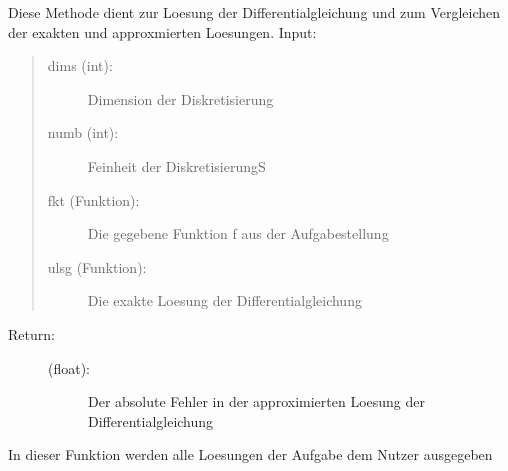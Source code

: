 \documentclass[letterpaper,10pt,ngerman, oneside, openright]{sphinxmanual}
\begin{document}

\begin{fulllineitems}
\label{\detokenize{index:aufg_5_2.loesg}}
Diese Methode dient zur Loesung der Differentialgleichung und zum Vergleichen der exakten
und approxmierten Loesungen.
Input:
\begin{quote}
\begin{description}
\item[{dims (int):}] \leavevmode
Dimension der Diskretisierung

\item[{numb (int):}] \leavevmode
Feinheit der DiskretisierungS

\item[{fkt (Funktion):}] \leavevmode
Die gegebene Funktion f aus der Aufgabestellung

\item[{ulsg (Funktion):}] \leavevmode
Die exakte Loesung der Differentialgleichung

\end{description}
\end{quote}
\begin{description}
\item[{Return:}] \leavevmode\begin{description}
\item[{(float):}] \leavevmode
Der absolute Fehler in der approximierten Loesung der Differentialgleichung

\end{description}

\end{description}

\end{fulllineitems}


\begin{fulllineitems}
\label{\detokenize{index:aufg_5_2.main}}
In dieser Funktion werden alle Loesungen der Aufgabe dem Nutzer ausgegeben

\end{fulllineitems}

\end{document}
